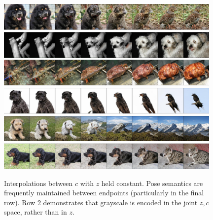 \begin{figure}[htbp]
\centering
\includegraphics[width=0.98\textwidth]{images/interps0/256CInterp3.jpg} \\
\includegraphics[width=0.98\textwidth]{images/interps0/256CInterp1.jpg} \\
\includegraphics[width=0.98\textwidth]{images/interps0/256CInterp2.jpg} \\
\includegraphics[width=0.98\textwidth]{images/interps0/256CInterp6.jpg} \\
\includegraphics[width=0.98\textwidth]{images/interps0/256CInterp1a.jpg} \\
\includegraphics[width=0.98\textwidth]{images/interps0/256Cinterp7.jpg} 
\caption{Interpolations between $c$ with $z$ held constant. Pose semantics are frequently maintained between endpoints (particularly in the final row). Row 2 demonstrates that grayscale is encoded in the joint $z,c$ space, rather than in $z$.}
\label{appendix_Cinterp}
\end{figure}



